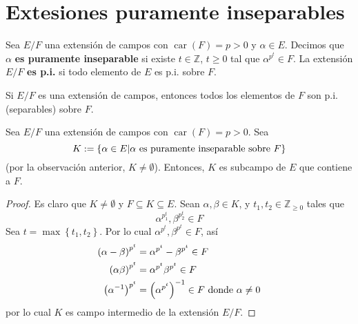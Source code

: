 \documentclass[12pt]{report}
\theoremstyle{largebreak}
\DeclareMathOperator{\car}{car}
\begin{document}
    \section{Extesiones puramente inseparables}

    \begin{mydef}
        Sea $E/F$ una extensión de campos con $\car(F)=p>0$ y $\alpha\in E$. Decimos que $\alpha$ \textbf{es puramente inseparable} si existe $t\in \mathbb{Z}$, $t\geq 0$ tal que $\alpha^{p^t}\in F$.
        La extensión $E/F$ \textbf{es p.i.} si todo elemento de $E$ es p.i. sobre $F$.
    \end{mydef}

    \begin{obs}
        Si $E/F$ es una extensión de campos, entonces todos los elementos de $F$ son p.i. (separables) sobre $F$. 
    \end{obs}

    \begin{propo}
        Sea $E/F$ una extensión de campos con $\car(F)=p>0$. Sea
        \begin{equation*}
            K:=\left\{\alpha\in E|\alpha\textup{ es puramente inseparable sobre }F\right\}
        \end{equation*}
        (por la observación anterior, $K\neq \emptyset$). Entonces, $K$ es subcampo de $E$ que contiene a $F$.
    \end{propo}

    \begin{proof}
        Es claro que $K\neq \emptyset$ y $F\subseteq K \subseteq E$. Sean $\alpha, \beta\in K$, y $t_1,t_2\in \mathbb{Z}_{\geq0}$ tales que
        \begin{equation*}
            \alpha^{p^t_1},\beta^{p^t_2}\in F
        \end{equation*}
        Sea $t=\max\left\{t_1,t_2\right\}$. Por lo cual $\alpha^{p^t},\beta^{p^t}\in F$, así
        \begin{equation*}
            \begin{split}
                \left(\alpha-\beta\right)^{p^t}&=\alpha^{p^t}-\beta^{p^t}\in F\\
                \left(\alpha\beta\right)^{p^t}&=\alpha^{p^t}\beta^{p^t}\in F\\
                \left(\alpha^{-1}\right)^{p^t}&=\left(\alpha^{p^t}\right)^{-1}\in F\textup{ donde $\alpha\neq0$}
            \end{split}
        \end{equation*}
        por lo cual $K$ es campo intermedio de la extensión $E/F$.
    \end{proof}
\end{document}
